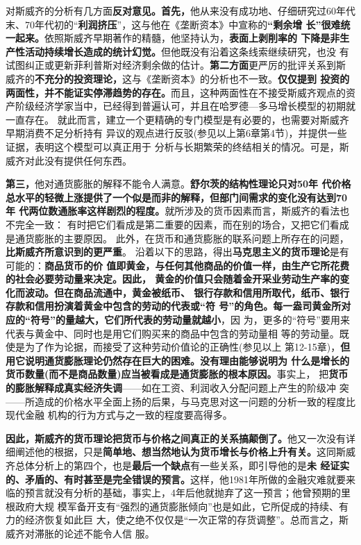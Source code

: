 对斯威齐的分析有几方面\textbf{反对意见。首先，}他从来没有成功地、仔细研究过60年代
末、70年代初的“\textbf{利润挤压}”，这与他在《垄断资本》中宣称的\textbf{“剩余增
  长”很难统一起来。}依照斯威齐早期著作的精髓，他坚持认为，\textbf{表面上剥削率的
  下降是非生产性活动持续增长造成的统计幻觉。}但他既没有沿着这条线索继续研究，也没
有试图纠正或更新菲利普斯对经济剩余做的估计。\textbf{第二方面}更严厉的批评关系到斯
威齐的\textbf{不充分的投资理论，}这与《垄断资本》的分析也不一致。\textbf{仅仅提到
  投资的两面性，并不能证实停滞趋势的存在。}而且，这种两面性在不接受斯威齐观点的资
产阶级经济学家当中，已经得到普遍认可，并且在哈罗德—多马增长模型的初期就一直存在。
就此而言，建立一个更精确的专门模型是有必要的，也需要对斯威齐早期消费不足分析持有
异议的观点进行反驳(参见以上第6章第4节)，并提供一些证据，表明这个模型可以真正用于
分析与长期繁荣的终结相关的情况。可是，斯威齐对此没有提供任何东西。

\textbf{第三，}他对通货膨胀的解释不能令人满意。\textbf{舒尔茨的结构性理论只对50年
  代价格总水平的轻微上涨提供了一个似是而非的解释，但部门间需求的变化没有达到70年
  代两位数通胀率这样剧烈的程度。}就所涉及的货币因素而言，斯威齐的看法也不完全一致：
有时把它们看成是第二重要的因素，而在别的场合，又把它们看成是通货膨胀的主要原因。
此外，在货币和通货膨胀的联系问题上所存在的问题，\textbf{比斯威齐所意识到的更严重}。
沿着以下的思路，得出\textbf{马克思主义的货币理论}是有可能的：\textbf{商品货币的价
  值即黄金，与任何其他商品的价值一样，由生产它所花费的社会必要劳动量来决定。因此，
  黄金的价值只会随着金开采业劳动生产率的变化而波动。但在商品流通中，黄金被纸币、
  银行存款和信用所取代，纸币、银行存款和信用扮演着黄金中包含的劳动的代表或“符
  号”的角色。每一盎司黄金所对应的“符号”的量越大，它们所代表的劳动量就越小}，因
为，更多的“符号”要用来代表与黄金中、同时也是用它们购买来的商品中包含的劳动量相
等的劳动量。既使是为了作为论据，而接受了这种劳动价值论的正确性(参见以上
第12-15章)，\textbf{但用它说明通货膨胀理论仍然存在巨大的困难。没有理由能够说明为
  什么是增长的货币数量(而不是商品数量)应当被看成是通货膨胀的根本原因。}事实上，
把\textbf{货币的膨胀解释成真实经济失调}——如在工资、利润收入分配问题上产生的阶级冲
突——所造成的价格水平全面上扬的后果，与马克思对这一问题的分析一致的程度比现代金融
机构的行为方式与之一致的程度要高得多。

\textbf{因此，斯威齐的货币理论把货币与价格之间真正的关系搞颠倒了。}他又一次没有详
细阐述他的根据，只是\textbf{简单地、想当然地认为货币增长与价格上升有关。}这同斯威
齐总体分析上的第四个，也是\textbf{最后一个缺点}有一些关系，即引导他的是\textbf{未
  经证实的、矛盾的、有时甚至是完全错误的预言。}这样，他1981年所做的金融灾难就要来
临的预言就没有分析的基础，事实上，4年后他就抛弃了这一预言；他曾预期的里根政府大规
模军备开支有“强烈的通货膨胀倾向”也是如此，它所促成的持续、有力的经济恢复如此巨
大，使之绝不仅仅是“一次正常的存货调整”。总而言之，斯威齐对滞胀的论述不能令人信
服。
\vfill

